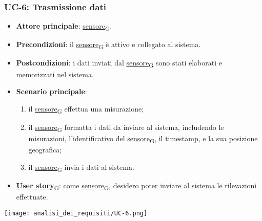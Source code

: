 \subsubsection{UC-6: Trasmissione dati}
\begin{itemize}
	\item \textbf{Attore principale}: \href{https://7last.github.io/docs/pb/documentazione-interna/glossario\#sensore}{sensore\textsubscript{G}}.
	\item \textbf{Precondizioni}: il \href{https://7last.github.io/docs/pb/documentazione-interna/glossario\#sensore}{sensore\textsubscript{G}} è attivo e collegato al sistema.
	\item \textbf{Postcondizioni}: i dati inviati dal \href{https://7last.github.io/docs/pb/documentazione-interna/glossario\#sensore}{sensore\textsubscript{G}} sono stati elaborati e memorizzati nel sistema.
	\item \textbf{Scenario principale}:
	      \begin{enumerate}
		      \item il \href{https://7last.github.io/docs/pb/documentazione-interna/glossario\#sensore}{sensore\textsubscript{G}} effettua una misurazione;
		      \item il \href{https://7last.github.io/docs/pb/documentazione-interna/glossario\#sensore}{sensore\textsubscript{G}} formatta i dati da inviare al sistema, includendo le misurazioni, l'identificativo del \href{https://7last.github.io/docs/pb/documentazione-interna/glossario\#sensore}{sensore\textsubscript{G}}, il timestamp, e la sua posizione geografica;
		      \item il \href{https://7last.github.io/docs/pb/documentazione-interna/glossario\#sensore}{sensore\textsubscript{G}} invia i dati al sistema.
	      \end{enumerate}
	\item \href{https://7last.github.io/docs/pb/documentazione-interna/glossario\#user-story}{\textbf{User story}\textsubscript{G}}: come \href{https://7last.github.io/docs/pb/documentazione-interna/glossario\#sensore}{sensore\textsubscript{G}}, desidero poter inviare al sistema le rilevazioni effettuate.
\end{itemize}
\begin{center}
	\texttt{[image: analisi\_dei\_requisiti/UC-6.png]}
\end{center}

\newpage
